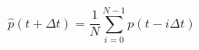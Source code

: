 \begin{equation}
	\hat{p}(t+\Delta t) = \frac{1}{N}\sum_{i=0}^{N-1}p(t-i\Delta t)
	\label{ch2:equ:simple-prediction}
\end{equation}